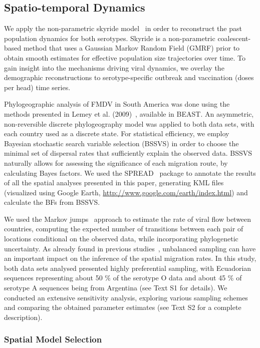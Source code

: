 \documentclass[10pt]{article}
\begin{document}
\subsection*{Spatio-temporal Dynamics}
We apply the non-parametric skyride model~\cite{skyride} in order to reconstruct the past population dynamics for both serotypes.
Skyride is a non-parametric coalescent-based method that uses a Gaussian Markov Random Field (GMRF) prior to obtain smooth estimates for effective population size trajectories over time.
To gain insight into the mechanisms driving viral dynamics, we overlay the demographic reconstructions to serotype-specific outbreak and vaccination (doses per head) time series.


Phylogeographic analysis of FMDV in South America was done using the methods presented in Lemey et al. (2009)~\cite{roots}, available in BEAST. 
An asymmetric, non-reversible discrete phylogeography model was applied to both data sets, with each country used as a discrete state.
For statistical efficiency, we employ Bayesian stochastic search variable selection (BSSVS) in order to choose the minimal set of dispersal rates that sufficiently explain the observed data.
BSSVS naturally allows for assessing the significance of each migration route, by calculating Bayes factors.
We used the SPREAD~\cite{spread} package to annotate the results of all the spatial analyses presented in this paper, generating KML files (visualized using Google Earth, \url{http://www.google.com/earth/index.html}) and calculate the BFs from BSSVS.

We used the Markov jumps~\cite{Minin2008} approach to estimate the rate of viral flow between countries, computing the expected number of transitions between each pair of locations conditional on the observed data, while incorporating phylogenetic uncertainty.
As already found in previous studies~\cite{Faria2012, Lemey2014}, unbalanced sampling can have an important impact on the inference of the spatial migration rates.
In this study, both data sets analysed presented highly preferential sampling, with Ecuadorian sequences representing about 50 \% of the serotype O data and about 45 \% of serotype A sequences being from Argentina (see Text S1 for details).
We conducted an extensive sensitivity analysis, exploring various sampling schemes and comparing the obtained parameter estimates (see Text S2 for a complete description).

\subsubsection*{Spatial Model Selection}
\end{document}
